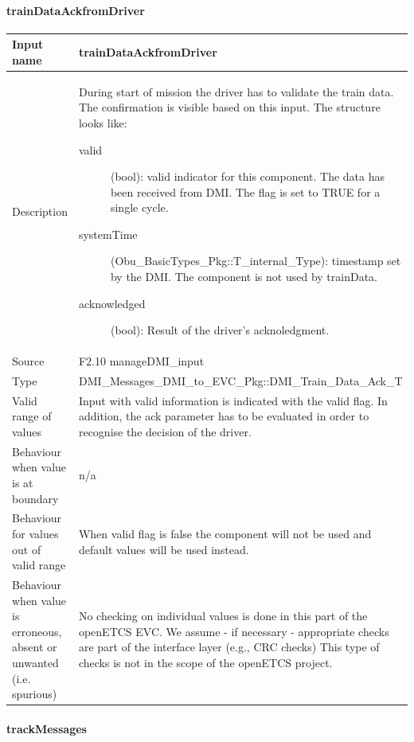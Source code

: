 \paragraph{trainDataAckfromDriver}

\begin{longtable}{p{}p{}}
\toprule
Input name				& trainDataAckfromDriver \\
\midrule
Description				& During start of mission the driver has to validate the train data. The confirmation is visible  based on this input. The structure looks like:
\begin{description}
\item[valid](bool): valid indicator for this component. The data has been received from DMI. The flag is set to TRUE for a single cycle. 
\item[systemTime](Obu\_BasicTypes\_Pkg::T\_internal\_Type): timestamp set by the DMI. The component is not used by trainData.
\item[acknowledged](bool): Result of the driver's acknoledgment.
\end{description} \\
\midrule
Source					& F2.10 manageDMI\_input\\ 
\midrule
Type					& DMI\_Messages\_DMI\_to\_EVC\_Pkg::DMI\_Train\_Data\_Ack\_T \\
\midrule
Valid range of values	& Input with valid information is indicated with the valid flag. In addition, the ack parameter has to be evaluated in order to recognise the decision of the driver.\\
\midrule
Behaviour when value is at boundary	& n/a\\
\midrule
Behaviour for values out of valid range	& When valid flag is false the component will not be used and default values will be used instead.\\
\midrule
Behaviour when value is erroneous, absent or unwanted (i.e. spurious) & No checking on individual values is done in this part of the openETCS EVC. We assume - if necessary - appropriate checks are part of the interface layer (e.g., CRC checks) This type of checks is not in the scope of the openETCS project.\\

\bottomrule
\end{longtable}
\paragraph{trackMessages}


